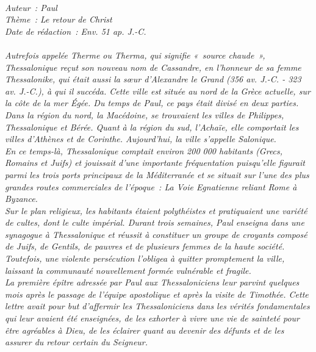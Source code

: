 \BFont
\noindent\hrulefill
{\footnotesize
\textit{
\bigskip
{\centering{}
\\Auteur~: Paul
\\Thème~: Le retour de Christ
\\Date de rédaction~: Env. 51 ap. J.-C.\\}
}
\textit{
\\Autrefois appelée Therme ou Therma, qui signifie «~source chaude~», Thessalonique reçut son nouveau nom de Cassandre, en l'honneur de sa femme Thessalonike, qui était aussi la sœur d'Alexandre le Grand (356 av. J.-C. - 323 av. J.-C.), à qui il succéda. Cette ville est située au nord de la Grèce actuelle, sur la côte de la mer Égée. Du temps de Paul, ce pays était divisé en deux parties. Dans la région du nord, la Macédoine, se trouvaient les villes de Philippes, Thessalonique et Bérée. Quant à la région du sud, l'Achaïe, elle comportait les villes d'Athènes et de Corinthe. Aujourd'hui, la ville s'appelle Salonique.
\\En ce temps-là, Thessalonique comptait environ 200 000 habitants (Grecs, Romains et Juifs) et jouissait d'une importante fréquentation puisqu'elle figurait parmi les trois ports principaux de la Méditerranée et se situait sur l'une des plus grandes routes commerciales de l'époque~: La Voie Egnatienne reliant Rome à Byzance.
\\Sur le plan religieux, les habitants étaient polythéistes et pratiquaient une variété de cultes, dont le culte impérial. Durant trois semaines, Paul enseigna dans une synagogue à Thessalonique et réussit à constituer un groupe de croyants composé de Juifs, de Gentils, de pauvres et de plusieurs femmes de la haute société. Toutefois, une violente persécution l'obligea à quitter promptement la ville, laissant la communauté nouvellement formée vulnérable et fragile.
\\La première épître adressée par Paul aux Thessaloniciens leur parvint quelques mois après le passage de l'équipe apostolique et après la visite de Timothée. Cette lettre avait pour but d'affermir les Thessaloniciens dans les vérités fondamentales qui leur avaient été enseignées, de les exhorter à vivre une vie de sainteté pour être agréables à Dieu, de les éclairer quant au devenir des défunts et de les assurer du retour certain du Seigneur.\bigskip
}
}
\par\nobreak\noindent\hrulefill
